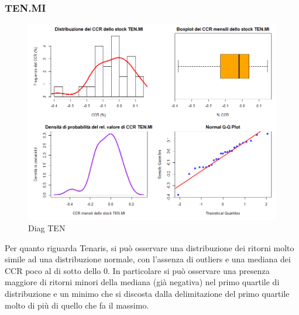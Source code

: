 \documentclass[12pt]{article}
\begin{document}
\subsubsection{TEN.MI}
\begin{figure}[!htb]
    \centering
    \includegraphics[width=1\textwidth]{immagini/diag_ten.png}
    \caption{Diag TEN}
\end{figure}
\FloatBarrier
Per quanto riguarda Tenaris, si può osservare una distribuzione dei ritorni molto simile ad una distribuzione normale, con l'assenza di outliers e una mediana dei CCR poco al di sotto dello 0. In particolare si può osservare una presenza maggiore di ritorni minori della mediana (già negativa) nel primo quartile di distribuzione e un minimo che si discosta dalla delimitazione del primo quartile molto di più di quello che fa il massimo.
\newpage
\end{document}
